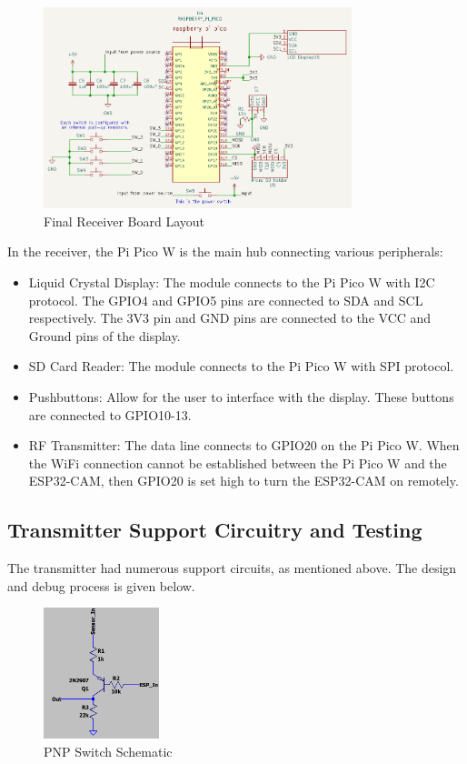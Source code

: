 \documentclass[class=report,11pt,crop=false]{standalone}
\begin{document}
\begin{figure}[ht]
\centering
\includegraphics[width=0.8\textwidth]{Images/Receiver_layout.png}
\caption{Final Receiver Board Layout}
\label{fig:my_label3}
\end{figure}

In the receiver, the Pi Pico W is the main hub connecting various peripherals:
\begin{itemize}
    \item Liquid Crystal Display: The module connects to the Pi Pico W with I2C protocol. The GPIO4 and GPIO5 pins are connected to SDA and SCL respectively. The 3V3 pin and GND pins are connected to the VCC and Ground pins of the display. 
    \item SD Card Reader: The module connects to the Pi Pico W with SPI protocol. 
    \item Pushbuttons: Allow for the user to interface with the display. These buttons are connected to GPIO10-13. 
    \item RF Transmitter: The data line connects to GPIO20 on the Pi Pico W. When the WiFi connection cannot be established between the Pi Pico W and the ESP32-CAM, then GPIO20 is set high to turn the ESP32-CAM on remotely. 
\end{itemize}



\subsection{Transmitter Support Circuitry and Testing}
The transmitter had numerous support circuits, as mentioned above. The design and debug process is given below. 

\begin{figure}[ht]
\centering
\includegraphics[width=0.3\textwidth]{Images/Switch_circuit.png}
\caption{PNP Switch Schematic}
\label{fig:my_label4}
\end{figure}
\end{document}
